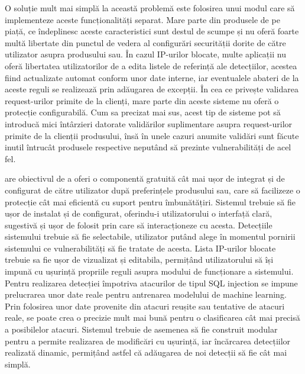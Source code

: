 O soluție mult mai simplă la această problemă este folosirea unui modul care să implementeze aceste funcționalități separat. Mare parte din produsele de pe piață, ce îndeplinesc aceste caracteristici sunt destul de scumpe și nu oferă foarte multă libertate din punctul de vedera al configurări securității dorite de către utilizator asupra produsului sau. În cazul IP-urilor blocate, multe aplicații nu oferă libertatea utilizatorilor de a edita listele de referință ale detecțiilor, acestea fiind actualizate automat conform unor date interne, iar eventualele abateri de la aceste reguli se realizează prin adăugarea de excepții. În cea ce privește validarea request-urilor primite de la clienți, mare parte din aceste sisteme nu oferă o protecție configurabilă. Cum sa precizat mai sus, acest tip de sisteme pot să introducă mici întârzieri datorate validărilor suplimentare asupra request-urilor primite de la clienții produsului, însă în unele cazuri anumite validări sunt făcute inutil întrucât produsele respective neputând să prezinte vulnerabilități de acel fel. 

 \textit{\thesistitle}  are obiectivul de a oferi o componentă gratuită cât mai ușor de integrat și de configurat de către utilizator după preferințele produsului sau, care să facilizeze o protecție cât mai eficientă cu suport pentru îmbunătățiri. Sistemul trebuie să fie ușor de instalat și de configurat, oferindu-i utilizatorului o interfață clară, sugestivă și ușor de folosit prin care să interacționeze cu acesta. Detecțiile sistemului trebuie să fie selectabile, utilizator putând alege în momentul pornirii sistemului ce vulnerabilități să fie tratate de acesta. Lista IP-urilor blocate trebuie sa fie ușor de vizualizat și editabila, permițând utilizatorului să își impună cu ușurință propriile reguli asupra modului de funcționare a sistemului. Pentru realizarea detecției împotriva atacurilor de tipul SQL injection se impune prelucrarea unor date reale pentru antrenarea modelului de machine learning. Prin folosirea unor date provenite din atacuri reușite sau tentative de atacuri reale, se poate crea o precizie mult mai bună pentru o clasificarea cât mai precisă a posibilelor atacuri. Sistemul trebuie de asemenea să fie construit modular pentru a permite realizarea de modificări cu ușurință, iar încărcarea detecțiilor realizată dinamic, permițând astfel că adăugarea de noi detecții să fie cât mai simplă. 




